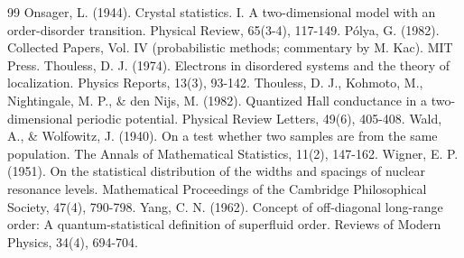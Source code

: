 \documentclass[10pt]{article}
\begin{document}
\begin{thebibliography}{99}
 Onsager, L. (1944). Crystal statistics. I. A two-dimensional model with an order-disorder transition. Physical Review, 65(3-4), 117-149.
 Pólya, G. (1982). Collected Papers, Vol. IV (probabilistic methods; commentary by M. Kac). MIT Press.
 Thouless, D. J. (1974). Electrons in disordered systems and the theory of localization. Physics Reports, 13(3), 93-142.
 Thouless, D. J., Kohmoto, M., Nightingale, M. P., \& den Nijs, M. (1982). Quantized Hall conductance in a two-dimensional periodic potential. Physical Review Letters, 49(6), 405-408.
 Wald, A., \& Wolfowitz, J. (1940). On a test whether two samples are from the same population. The Annals of Mathematical Statistics, 11(2), 147-162.
 Wigner, E. P. (1951). On the statistical distribution of the widths and spacings of nuclear resonance levels. Mathematical Proceedings of the Cambridge Philosophical Society, 47(4), 790-798.
 Yang, C. N. (1962). Concept of off-diagonal long-range order: A quantum-statistical definition of superfluid order. Reviews of Modern Physics, 34(4), 694-704.
\end{thebibliography}
\end{document}
